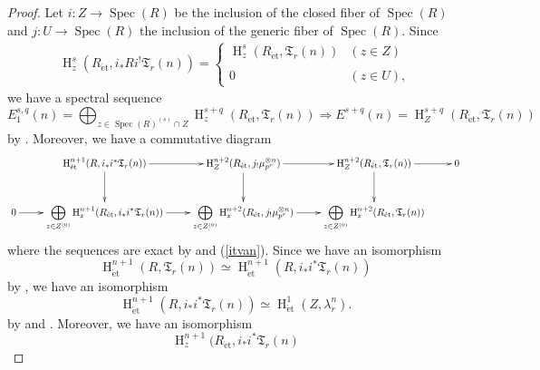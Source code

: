 \documentclass{article}
\newcommand{\spec}{\operatorname{Spec}}
\newcommand{\et}{\mathrm{\acute{e}t}}
\newcommand{\HO}{\operatorname{H}}
\begin{document}
%
\begin{proof}\upshape
Let $i: Z\to\spec(R)$ be the inclusion of the closed fiber of $\spec(R)$
and
$j: U\to\spec(R)$ the inclusion of the generic fiber of $\spec(R)$.
Since
%
\begin{align*}
\HO^{s}_{z}(
R_{\et}, i_{*}Ri^{!}\mathfrak{T}_{r}(n)
)
=
%
\begin{cases}
\HO^{s}_{z}(R_{\et}, \mathfrak{T}_{r}(n))
& (z\in Z) \\
\\
0
& (z\in U),
\end{cases}
%    
\end{align*}
%
we have a spectral sequence
%
\begin{equation}\label{ConiST}
E^{s, q}_{1}(n)
=
\displaystyle\bigoplus_{z\in\spec(R)^{(s)}\cap Z}
\HO^{s+q}_{z}(
R_{\et},
\mathfrak{T}_{r}(n)
)
\Rightarrow   
E^{s+q}(n)
=
\HO_{Z}^{s+q}
(R_{\et}, \mathfrak{T}_{r}(n))
\end{equation}
%
by \cite[Proposition 3.8]{Sak4}.
Moreover, we have a commutative diagram
%
\scriptsize
\begin{equation}\label{snZ}
\xymatrix{
&
\HO_{\et}^{n+1}(R, i_{*}i^{*}\mathfrak{T}_{r}(n))
\ar[r]\ar[d]
&
\HO_{Z}^{n+2}(R_{\et}, j_{!}\mu_{p^{r}}^{\otimes n})
\ar[r]\ar[d]
&
\HO_{Z}^{n+2}(R_{\et}, \mathfrak{T}_{r}(n))
\ar[d]\ar[r]
&
0
\\
0\ar[r]
&
\displaystyle\bigoplus_{z\in Z^{(0)}}
\HO_{z}^{n+1}(R_{\et}, i_{*}i^{*}\mathfrak{T}_{r}(n))
\ar[r]
&
\displaystyle\bigoplus_{z\in Z^{(0)}}
\HO_{z}^{n+2}(R_{\et}, j_{!}\mu_{p^{r}}^{\otimes n})
\ar[r]
&
\displaystyle\bigoplus_{z\in Z^{(0)}}
\HO_{z}^{n+2}(R_{\et}, \mathfrak{T}_{r}(n))
}    
\end{equation}
\normalsize
%
where the sequences are exact 
by \cite[Theorem 1.3]{Sak5} and (\ref{itvan}).
Since we have an isomorphism
%
\begin{equation*}
\HO^{n+1}_{\et}(
R,
\mathfrak{T}_{r}(n)
)    
\simeq 
\HO^{n+1}_{\et}(
R,
i_{*}i^{*}
\mathfrak{T}_{r}(n)
)
\end{equation*}
%
by \cite[p.777, The proof of Proposition 2.2.b)]{Ge},
we have an isomorphism
%
\begin{equation}\label{iso1iTl}
\HO^{n+1}_{\et}(
R,
i_{*}i^{*}\mathfrak{T}_{r}(n)
)    
\simeq
\HO^{1}_{\et}(
Z,
\lambda_{r}^{n}
).
\end{equation}
%
by \cite[Theorem 1.2]{Sak4} and \cite[Theorem 1.4]{Sak4}.
Moreover, 
we have an isomorphism
%
\begin{equation*}
\HO^{n+1}_{z}(
R_{\et},
i_{*}i^{*}\mathfrak{T}_{r}(n)

\end{equation*}
\end{proof}
\end{document}
